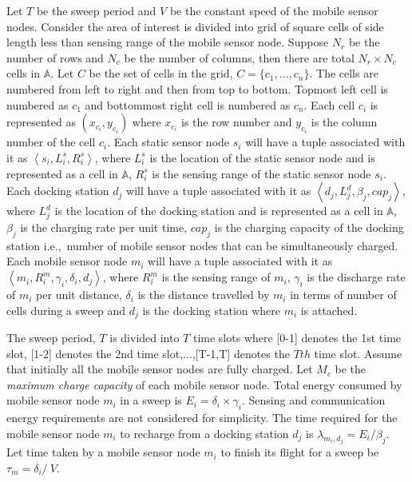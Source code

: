 Let $T$ be the sweep period and $V$ be the constant speed of the mobile sensor nodes. Consider the area of interest is divided into grid of square cells of side length less than sensing range of the mobile sensor node. Suppose $N_r$ be the number of rows and $N_c$ be the number of columns, then there are total $N_r \times N_c$ cells in $\mathbb{A}$. Let $C$ be the set of cells in the grid, $C=\{c_1,...,c_n\}$.  The cells are numbered from left to right and then from top to bottom. Topmost left cell is numbered as $c_1$ and bottommost right cell is numbered as $c_n$. Each cell $c_i$ is represented as $\left( x_{c_i},y_{c_i} \right)$ where $x_{c_i}$ is the row number and $y_{c_i}$ is the column number of the cell $c_i$.
Each static sensor node $s_i$ will have a tuple associated with it as $\left\langle s_i, L_i^s, R_i^s \right\rangle$, where $L_i^s$ is the location of the static sensor node and is represented as a cell in $\mathbb{A}$, $R_i^s$ is the sensing range of the static sensor node $s_i$.
Each docking station $d_j$ will have a tuple associated with it as $\left\langle d_j,L_j^d, \beta_j, cap_j \right\rangle $, where $L_j^d$ is the location of the docking station and is represented as a cell in $\mathbb{A}$, $\beta_j$ is the charging rate per unit time, $cap_j$ is the charging capacity of the docking station i.e.,\ number of mobile sensor nodes that can be simultaneously charged.
Each mobile sensor node $m_i$ will have a tuple associated with it as $\left\langle m_i, R_i^m, \gamma_i, \delta_i, d_j \right\rangle$, where $R_i^m$ is the sensing range of $m_i$, $\gamma_i$ is the discharge rate of $m_i$ per unit distance, $\delta_i$ is the distance travelled by $m_i$ in terms of number of cells during a sweep and $d_j$ is the docking station where $m_i$ is attached.

The sweep period, $T$ is divided into $T$ time slots where [0-1] denotes the 1st time slot, [1-2] denotes the 2nd time slot,...,[T-1,T] denotes the $Tth$ time slot.
Assume that initially all the mobile sensor nodes are fully charged. Let $M_c$ be the \textit{maximum charge capacity} of each mobile sensor node. Total energy consumed by mobile sensor node $m_i$ in a sweep is $E_i = \delta_i \times \gamma_i$. Sensing and communication energy requirements are not considered for simplicity. The time required for the mobile sensor node $m_i$ to recharge from a docking station $d_j$ is $\lambda_{m_i,d_j} = E_i / \beta_j$. Let time taken by a mobile sensor node $m_i$ to finish its flight for a sweep be $\tau_m = \delta_i / \ V$.

